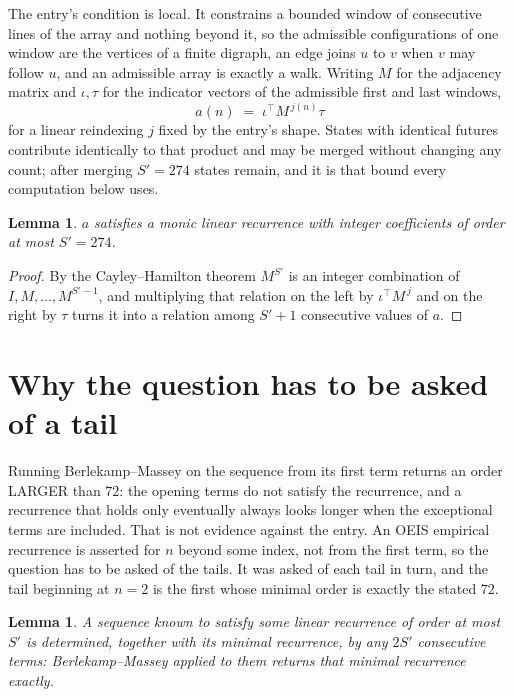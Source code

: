\documentclass[11pt,a4paper]{article}
\theoremstyle{plain}
\newtheorem{lemma}[theorem]{Lemma}
\theoremstyle{definition}
\begin{document}
The entry's condition is local. It constrains a bounded window of consecutive lines of the
array and nothing beyond it, so the admissible configurations of one window are the vertices of
a finite digraph, an edge joins $u$ to $v$ when $v$ may follow $u$, and an admissible array is
exactly a walk. Writing $M$ for the adjacency matrix and $\iota,\tau$ for the indicator vectors
of the admissible first and last windows,
\[
a(n)\;=\;\iota^{\!\top}M^{\,j(n)}\tau
\]
for a linear reindexing $j$ fixed by the entry's shape. States with identical futures
contribute identically to that product and may be merged without changing any count; after
merging $S'=274$ states remain, and it is that bound every computation below uses.

\begin{lemma}\label{lem:cf}
$a$ satisfies a monic linear recurrence with integer coefficients of order at most $S'=274$.
\end{lemma}

\begin{proof}
By the Cayley--Hamilton theorem $M^{S'}$ is an integer combination of $I,M,\dots,M^{S'-1}$,
and multiplying that relation on the left by $\iota^{\!\top}M^{\,j}$ and on the right by
$\tau$ turns it into a relation among $S'+1$ consecutive values of $a$.
\end{proof}

\section{Why the question has to be asked of a tail}

Running Berlekamp--Massey on the sequence from its first term returns an order LARGER than $72$: the opening terms do not satisfy the recurrence, and a recurrence that holds only eventually always looks longer when the exceptional terms are included. That is not evidence against the entry. An OEIS empirical recurrence is asserted for $n$ beyond some index, not from the first term, so the question has to be asked of the tails. It was asked of each tail in turn, and the tail beginning at $n=2$ is the first whose minimal order is exactly the stated $72$.

\begin{lemma}\label{lem:bm}
A sequence known to satisfy some linear recurrence of order at most $S'$ is determined,
together with its minimal recurrence, by any $2S'$ consecutive terms: Berlekamp--Massey applied
to them returns that minimal recurrence exactly.
\end{lemma}
\end{document}
